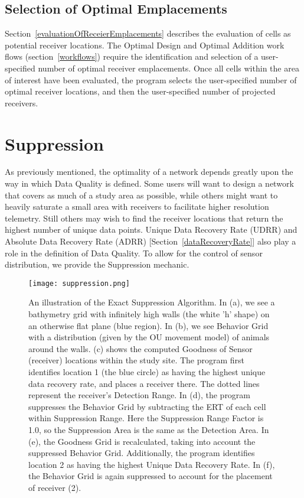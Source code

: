 \subsection{Selection of Optimal Emplacements}
\label{selectionOfOptimalEmplacements}
Section~\ref{evaluationOfReceierEmplacements} describes the evaluation of cells as potential receiver locations.  The Optimal Design and Optimal Addition work flows (section~\ref{workflows}) require the identification and selection of a user-specified number of optimal receiver emplacements.  Once all cells within the area of interest have been evaluated, the program selects the user-specified number of optimal receiver locations, and then the user-specified number of projected receivers.


\section{Suppression}
\label{suppression}
As previously mentioned, the optimality of a network depends greatly upon the way in which Data Quality is defined.  Some users will want to design a network that covers as much of a study area as possible, while others might want to heavily saturate a small area with receivers to facilitate higher resolution telemetry.  Still others may wish to find the receiver locations that return the highest number of unique data points.  Unique Data Recovery Rate (UDRR) and Absolute Data Recovery Rate (ADRR) [Section~\ref{dataRecoveryRate}] also play a role in the definition of Data Quality.  To allow for the control of sensor distribution, we provide the Suppression mechanic.


\begin{figure}[ht]
	\centering
	\texttt{[image: suppression.png]}
	\caption{An illustration of the Exact Suppression Algorithm.  In (a), we see a bathymetry grid with infinitely high walls (the white 'h' shape) on an otherwise flat plane (blue region).  In (b), we see Behavior Grid with a distribution (given by the OU movement model) of animals around the walls.  (c) shows the computed Goodness of Sensor (receiver) locations within the study site.  The program first identifies location 1 (the blue circle) as having the highest unique data recovery rate, and places a receiver there.  The dotted lines represent the receiver's Detection Range.  In (d), the program suppresses the Behavior Grid by subtracting the ERT of each cell within Suppression Range.  Here the Suppression Range Factor is 1.0, so the Suppression Area is the same as the Detection Area.  In (e), the Goodness Grid is recalculated, taking into account the suppressed Behavior Grid.  Additionally, the program identifies location 2 as having the highest Unique Data Recovery Rate.  In (f), the Behavior Grid is again suppressed to account for the placement of receiver (2).
		\label{suppressionImage}}
\end{figure}


